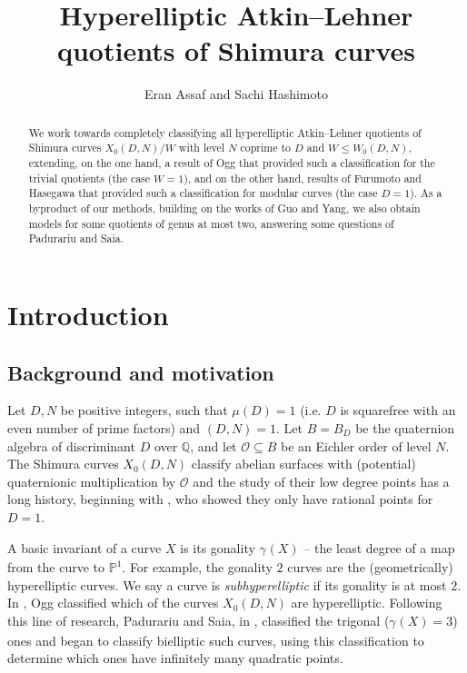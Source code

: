 \documentclass[12pt]{amsart}
\renewcommand{\P}{\mathbb{P}}
\newcommand{\Q}{\mathbb{Q}}
\newcommand{\calO}{\mathcal{O}}
\numberwithin{equation}{subsection}
\theoremstyle{plain}\newtheorem{ithm}{Theorem}
\theoremstyle{plain}\newtheorem{iprop}[ithm]{Proposition}
\theoremstyle{definition}
\theoremstyle{remark}
\newcommand{\Order}{\calO} %
\newcommand{\Curve}[2]{X_0({#1},{#2})} %
\newcommand{\ALfull}[2]{W_0({#1},{#2})} %
\newcommand{\gon}[2]{\gamma_{#2}(#1)}
\newcommand{\defi}[1]{\emph{#1}} %
\begin{document}
\title{Hyperelliptic Atkin--Lehner quotients of Shimura curves}

\author{Eran Assaf and Sachi Hashimoto}

\begin{abstract}
We work towards completely classifying all hyperelliptic Atkin--Lehner quotients of Shimura curves $\Curve{D}{N}/W$ with level $N$ coprime to $D$ and $W \le \ALfull{D}{N}$, extending, on the one hand, a result of Ogg that provided such a classification for the trivial quotients (the case $W = 1$), and on the other hand, results of Furumoto and Hasegawa that provided such a classification for modular curves (the case $D = 1$). As a byproduct of our methods, building on the works of Guo and Yang, we also obtain models for some quotients of genus at most two, answering some questions of Padurariu and Saia.
\end{abstract}

\maketitle


\section{Introduction}

\subsection{Background and motivation}
Let $D, N$ be positive integers, such that $\mu(D) = 1$ (i.e. $D$ is squarefree with an even number of prime factors) and $(D,N) = 1$. Let $B = B_D$ be the quaternion algebra of discriminant $D$ over $\Q$, and let $\Order \subseteq B$ be an Eichler order of level $N$. The Shimura curves $\Curve{D}{N}$ classify abelian surfaces with (potential) quaternionic multiplication by $\Order$ and the study of their low degree points has a long history, beginning with \cite{Ogg}, who showed they only have rational points for $D = 1$. 

A basic invariant of a curve $X$ is its gonality $\gon{X}{}$ -- the least degree of a map from the curve to $\P^1$. For example, the gonality $2$ curves are the (geometrically) hyperelliptic curves. We say a curve is \defi{subhyperelliptic} if its gonality is at most $2$.
In \cite{OggHyperelliptic}, Ogg classified which of the curves $\Curve{D}{N}$ are hyperelliptic. Following this line of research, Padurariu and Saia, in \cite{OanaFreddyBielliptic}, classified the trigonal ($\gon{X}{} = 3$) ones and began to classify bielliptic such curves, using this classification to determine which ones have infinitely many quadratic points.
\end{document}
